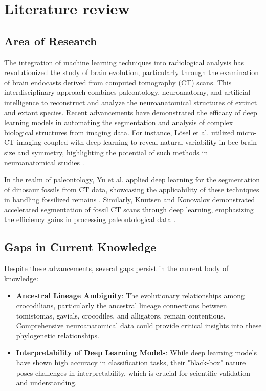 \chapter{Literature review}
\section{Area of Research}
The integration of machine learning techniques into radiological analysis has revolutionized the study of brain evolution, particularly through the examination of brain endocasts derived from computed tomography (CT) scans. This interdisciplinary approach combines paleontology, neuroanatomy, and artificial intelligence to reconstruct and analyze the neuroanatomical structures of extinct and extant species. Recent advancements have demonstrated the efficacy of deep learning models in automating the segmentation and analysis of complex biological structures from imaging data. For instance, Lösel et al. utilized micro-CT imaging coupled with deep learning to reveal natural variability in bee brain size and symmetry, highlighting the potential of such methods in neuroanatomical studies \cite{L_sel_2023}.

In the realm of paleontology, Yu et al. applied deep learning for the segmentation of dinosaur fossils from CT data, showcasing the applicability of these techniques in handling fossilized remains \cite{Yu_2022}. Similarly, Knutsen and Konovalov demonstrated accelerated segmentation of fossil CT scans through deep learning, emphasizing the efficiency gains in processing paleontological data \cite{Knutsen_2024}.

\section{Gaps in Current Knowledge}
Despite these advancements, several gaps persist in the current body of knowledge:

\begin{itemize}
    \item \textbf{Ancestral Lineage Ambiguity}: The evolutionary relationships among crocodilians, particularly the ancestral lineage connections between tomistomas, gavials, crocodiles, and alligators, remain contentious. Comprehensive neuroanatomical data could provide critical insights into these phylogenetic relationships.
    \item \textbf{Interpretability of Deep Learning Models}: While deep learning models have shown high accuracy in classification tasks, their "black-box" nature poses challenges in interpretability, which is crucial for scientific validation and understanding.
\end{itemize}

